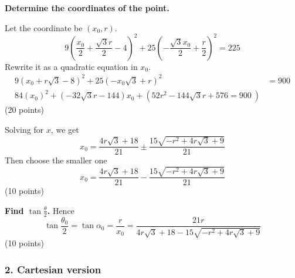 \begin{description}

  \textbf{Determine the coordinates of the point.}

  Let the coordinate be $(x_0, r)$.
  \[
    9\left(\frac{x_0}{2} + \frac{\sqrt{3}r}{2} - 4\right)^2
      + 25\left(-\frac{\sqrt{3}x_0}{2} + \frac{r}{2}\right)^2 = 225
  \]
  Rewrite it as a quadratic equation in $x_0$.
  \begin{align*}
    9\left(x_0 + r\sqrt{3} - 8\right)^2
      + 25\left(-x_0\sqrt{3} + r\right)^2 &= 900 \\
    84(x_0)^2 + \left(-32\sqrt{3}r - 144\right)x_0
      + \left(52r^2 - 144\sqrt{3}r + 576 = 900\ \right) %
  \end{align*}
  \hfill(20 points)

  Solving for $x$, we get
  \[
    x_0 = \frac{4r\sqrt{3} + 18}{21}
      \pm \frac{15\sqrt{-r^2 + 4r\sqrt{3} + 9}}{21}
  \]
  Then choose the smaller one
  \[
    x_0 = \frac{4r\sqrt{3} + 18}{21}
      - \frac{15\sqrt{-r^2 + 4r\sqrt{3} + 9}}{21}
  \]
  \hfill(10 points)

  \textbf{Find $\tan\frac{\theta}{2}$.} Hence
  \[
    \tan\frac{\theta_0}{2} = \tan\alpha_0 = \frac{r}{x_0}
      = \frac{21r}{4r\sqrt{3} + 18 - 15\sqrt{-r^2 + 4r\sqrt{3} + 9}}
  \]
  \hfill(10 points)
\end{description}

\subsubsection*{2. Cartesian version}

